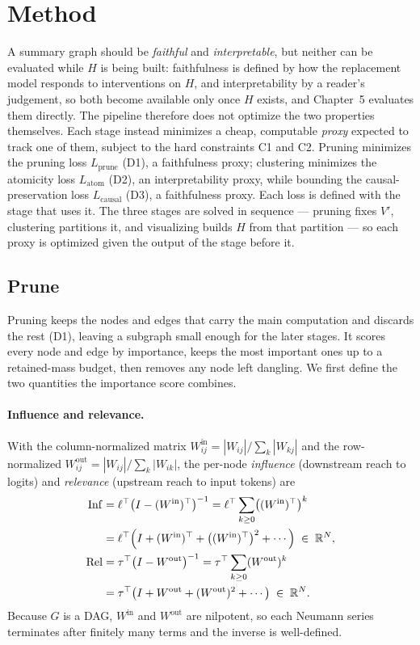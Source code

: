 \documentclass[../main.tex]{subfiles}
\begin{document}
\section{Method}
\label{sec:method}

A summary graph should be \emph{faithful} and \emph{interpretable}, but neither can
be evaluated while $H$ is being built: faithfulness is defined by how the replacement
model responds to interventions on $H$, and interpretability by a reader's
judgement, so both become available only once $H$ exists, and Chapter~5 evaluates
them directly. The pipeline therefore does not optimize the two properties
themselves. Each stage instead minimizes a cheap, computable \emph{proxy} expected
to track one of them, subject to the hard constraints C1 and C2. Pruning minimizes
the pruning loss $L_{\text{prune}}$ (D1), a faithfulness proxy; clustering minimizes
the atomicity loss $L_{\text{atom}}$ (D2), an interpretability proxy, while bounding
the causal-preservation loss $L_{\text{causal}}$ (D3), a faithfulness proxy. Each
loss is defined with the stage that uses it. The three stages are solved in sequence
--- pruning fixes $V'$, clustering partitions it, and visualizing builds $H$ from
that partition --- so each proxy is optimized given the output of the stage before it.

\subsection{Prune}\label{sec:stage1}
Pruning keeps the nodes and edges that carry the main computation and discards
the rest (D1), leaving a subgraph small enough for the later stages. It scores every
node and edge by importance, keeps the most important ones up to a retained-mass
budget, then removes any node left dangling. We first define the two quantities the
importance score combines.

\paragraph{Influence and relevance.}
With the column-normalized matrix
$W^{\text{in}}_{ij} = |W_{ij}|/\sum_k |W_{kj}|$ and the row-normalized
$W^{\text{out}}_{ij} = |W_{ij}|/\sum_k |W_{ik}|$, the per-node \emph{influence}
(downstream reach to logits) and \emph{relevance} (upstream reach to input
tokens) are
\begin{align}
\mathrm{Inf} &= \ell^\top \bigl(I - (W^{\text{in}})^\top\bigr)^{-1}
= \ell^\top \sum_{k \ge 0} \bigl((W^{\text{in}})^\top\bigr)^k \nonumber\\
&= \ell^\top \Bigl(I + (W^{\text{in}})^\top + \bigl((W^{\text{in}})^\top\bigr)^2 + \cdots\Bigr)
\;\in\; \mathbb{R}^N, \label{eq:inf}\\
\mathrm{Rel} &= \tau^\top \bigl(I - W^{\text{out}}\bigr)^{-1}
= \tau^\top \sum_{k \ge 0} (W^{\text{out}})^k \nonumber\\
&= \tau^\top \bigl(I + W^{\text{out}} + (W^{\text{out}})^2 + \cdots\bigr)
\;\in\; \mathbb{R}^N. \label{eq:rel}
\end{align}
Because $G$ is a DAG, $W^{\text{in}}$ and $W^{\text{out}}$ are nilpotent, so each
Neumann series terminates after finitely many terms and the inverse is
well-defined.
\end{document}
